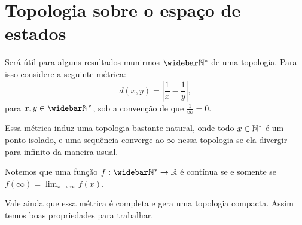 \section{Topologia sobre o espaço de estados}
\label{sec:topologia}

Será útil para alguns resultados munirmos $\Nzb$ de uma
topologia. Para isso considere a seguinte métrica:
\begin{equation}
  \label{eq:metrica}
  d(x, y) = \left\lvert \frac{1}{x} - \frac{1}{y} \right\rvert,
\end{equation}
para $x, y \in \Nzb$, sob a convenção de que $\frac{1}{\infty} = 0$.

Essa métrica induz uma topologia bastante natural, onde todo $x \in
{\mathbb{N^*}}$ é um ponto isolado, e uma sequência converge ao $\infty$ nessa
topologia se ela divergir para infinito da maneira usual.

Notemos que uma função $f: \Nzb \to \R$ é contínua se e somente se
$f(\infty) = \lim_{x \to \infty} f(x)$.

Vale ainda que essa métrica é completa e gera uma topologia
compacta. Assim temos boas propriedades para trabalhar.

